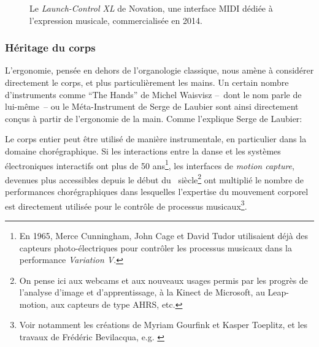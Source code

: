 \begin{figure}[!htbp]
\begin{minipage}[t]{0.48\textwidth}
		\caption[L'interface MIDI Novation Launch-Control-XL]{Le \textit{Launch-Control XL} de Novation, une interface \gls{MIDI} dédiée à l'expression musicale, commercialisée en 2014.}
		\label{fig:interface:launchpad-controlXL}
	\end{minipage}
\end{figure}

\subsubsection{Héritage du corps}

\noindent L'ergonomie, pensée en dehors de l'organologie classique, nous amène à considérer directement le corps, et plus particulièrement les mains. Un certain nombre d'instruments comme ``The Hands'' de Michel Waisvisz --~dont le nom parle de lui-même~-- ou le Méta-Instrument de Serge de Laubier sont ainsi directement conçus à partir de l'ergonomie de la main. Comme l'explique Serge de Laubier: 
	\begin{quotation}
	\end{quotation}
\indent Le corps entier peut être utilisé de manière instrumentale, en particulier dans la domaine chorégraphique. Si les interactions entre la danse et les systèmes électroniques interactifs ont plus de 50 ans\footnote{En 1965, Merce Cunningham, John Cage et David Tudor utilisaient déjà des capteurs photo-électriques pour contrôler les processus musicaux dans la performance \textit{Variation V}.}, les interfaces de \textit{motion capture}, devenues plus accessibles depuis le début du ~siècle\footnote{On pense ici aux webcams et aux nouveaux usages permis par les progrès de l'analyse d'image et d'apprentissage, à la Kinect de Microsoft, au Leap-motion, aux capteurs de type \gls{AHRS}, etc.} ont multiplié le nombre de performances chorégraphiques dans lesquelles l'expertise du mouvement corporel est directement utilisée pour le contrôle de processus musicaux\footnote{Voir notamment les créations de Myriam Gourfink et Kasper Toeplitz, et les travaux de Frédéric Bevilacqua, e.g. \cite{bevilacqua_gesture_2011}}.\\
